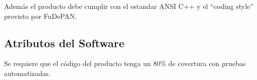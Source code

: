 \documentclass[10pt,a4paper]{article}
\begin{document}
    Adem\'as el producto debe cumplir con el estandar ANSI C++ y el ``coding style'' provisto por FuDePAN.

  \subsection{Atributos del Software}
    Se requiere que el c\'odigo del producto tenga un 80\% de covertura con pruebas automatizadas.

\pagebreak

\begin{appendices} 
  
       
\end{appendices}
\end{document}
